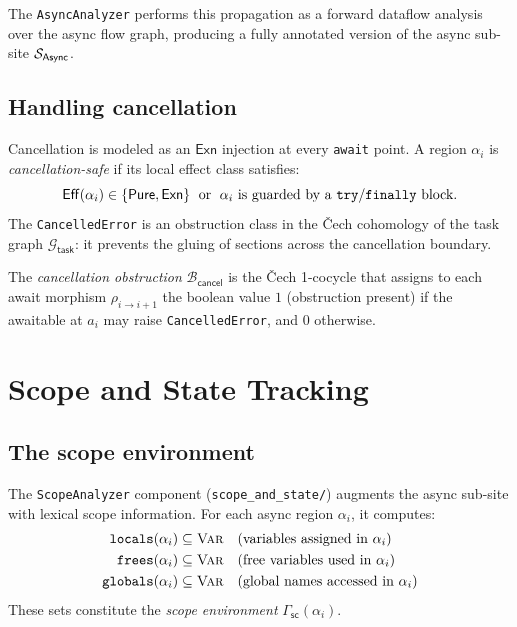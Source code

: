 \documentclass[11pt]{article}
\newcommand{\Async}{\mathsf{Async}}          %
\newcommand{\AwaitMor}[2]{\rho_{#1 \to #2}} %
\newcommand{\asyncSite}{\Site_{\Async}}      %
\newcommand{\Epure}{\mathsf{Pure}}           %
\newcommand{\Eexn}{\mathsf{Exn}}             %
\newcommand{\effectClass}[1]{\mathsf{Eff}(#1)} %
\newcommand{\asyncRegion}[1]{\alpha_{#1}}    %
\newcommand{\scopeEnv}{\Gamma_{\mathsf{sc}}} %
\newcommand{\taskGraph}{\mathcal{G}_{\mathsf{task}}} %
\newcommand{\cancelObs}{\mathcal{B}_{\mathsf{cancel}}} %
\begin{document}
The \texttt{AsyncAnalyzer} performs this propagation as a forward dataflow
analysis over the async flow graph, producing a fully annotated version of
the async sub-site $\asyncSite$.

\subsection{Handling cancellation}

Cancellation is modeled as an $\Eexn$ injection at every \texttt{await}
point.  A region $\asyncRegion{i}$ is \emph{cancellation-safe} if its
local effect class satisfies:
\[
  \effectClass{\asyncRegion{i}} \in \{\Epure, \Eexn\}
  \;\text{ or }\;
  \asyncRegion{i} \text{ is guarded by a \texttt{try}/\texttt{finally} block}.
\]
The \texttt{CancelledError} is an obstruction class in the Čech cohomology of
the task graph $\taskGraph$: it prevents the gluing of sections across the
cancellation boundary.

\begin{definition}\label{def:cancel-obs}
The \emph{cancellation obstruction} $\cancelObs$ is the Čech 1-cocycle
that assigns to each await morphism $\AwaitMor{i}{i+1}$ the boolean value
$1$ (obstruction present) if the awaitable at $a_i$ may raise
\texttt{CancelledError}, and $0$ otherwise.
\end{definition}

\section{Scope and State Tracking}\label{sec:scope-state}

\subsection{The scope environment}

The \texttt{ScopeAnalyzer} component (\texttt{scope\_and\_state/}) augments
the async sub-site with lexical scope information.  For each async region
$\asyncRegion{i}$, it computes:
\begin{align*}
  \texttt{locals}(\asyncRegion{i})  &\subseteq \textsc{Var}
    \quad (\text{variables assigned in } \asyncRegion{i})\\
  \texttt{frees}(\asyncRegion{i})   &\subseteq \textsc{Var}
    \quad (\text{free variables used in } \asyncRegion{i})\\
  \texttt{globals}(\asyncRegion{i}) &\subseteq \textsc{Var}
    \quad (\text{global names accessed in } \asyncRegion{i})
\end{align*}
These sets constitute the \emph{scope environment}
$\scopeEnv(\asyncRegion{i})$.
\end{document}
